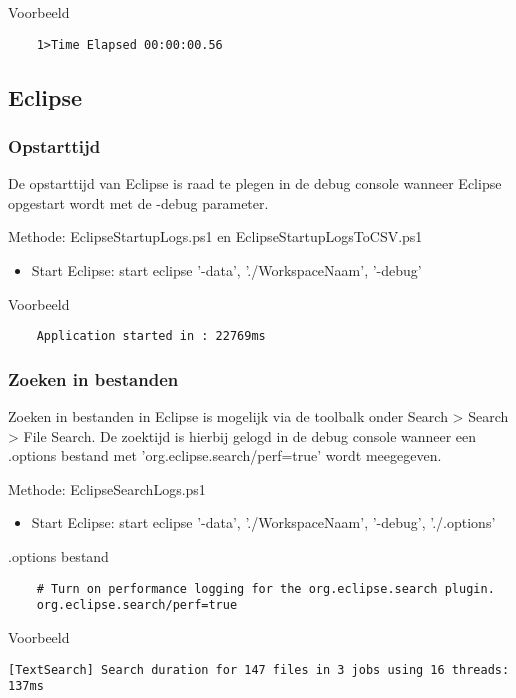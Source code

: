 Voorbeeld
\vspace{\verbatimOffset}
\begin{verbatim}
    1>Time Elapsed 00:00:00.56    
\end{verbatim}

\subsection{Eclipse}
\subsubsection{Opstarttijd}
De opstarttijd van Eclipse is raad te plegen in de debug console wanneer Eclipse opgestart wordt met de -debug parameter.

Methode: EclipseStartupLogs.ps1 en EclipseStartupLogsToCSV.ps1
\begin{itemize}
	\item Start Eclipse: start eclipse  '-data', './WorkspaceNaam', '-debug'
\end{itemize}

Voorbeeld
\vspace{\verbatimOffset}
\begin{verbatim}
    Application started in : 22769ms    
\end{verbatim}

\subsubsection{Zoeken in bestanden}
Zoeken in bestanden in Eclipse is mogelijk via de toolbalk onder Search > Search > File Search. De zoektijd is hierbij gelogd in de debug console wanneer een .options bestand met 'org.eclipse.search/perf=true' wordt meegegeven.

Methode: EclipseSearchLogs.ps1
\begin{itemize}
	\item Start Eclipse: start eclipse '-data', './WorkspaceNaam',  '-debug', './.options'
\end{itemize}

.options bestand
\vspace{\verbatimOffset}
\begin{verbatim}
    # Turn on performance logging for the org.eclipse.search plugin.
    org.eclipse.search/perf=true
\end{verbatim}

Voorbeeld
\vspace{\verbatimOffset}
\begin{verbatim}
[TextSearch] Search duration for 147 files in 3 jobs using 16 threads: 137ms    
\end{verbatim}

